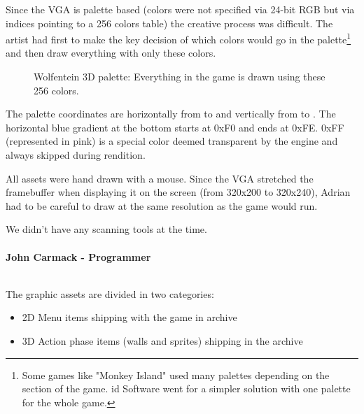 \documentclass[book.tex]{subfiles}
\begin{document}
\par
Since the VGA is palette based (colors were not specified via 24-bit RGB but via indices pointing to a 256 colors table) the creative process was difficult. The artist had first to make the key decision of which colors would go in the palette\footnote{Some games like "Monkey Island" used many palettes depending on the section of the game. id Software went for a simpler solution with one palette for the whole game.} and then draw everything with only these colors.\\
\begin{figure}[H]
  \centering
{}
 \caption{Wolfentein 3D palette: Everything in the game is drawn using these 256 colors.}
\end{figure}
The palette coordinates are horizontally from  to  and vertically from  to . The horizontal blue gradient at the bottom starts at 0xF0 and ends at 0xFE. 0xFF (represented in pink) is a special color deemed transparent by the engine and always skipped during rendition.\\
\par

All assets were hand drawn with a mouse. Since the VGA stretched the framebuffer when displaying it on the screen (from 320x200 to 320x240), Adrian had to be careful to draw at the same resolution as the game would run.\\
\par
\begin{fancyquotes}
We didn't have any scanning tools at the time.\\
\\
\textbf{John Carmack - Programmer}
\end{fancyquotes}
\\
The graphic assets are divided in two categories:
\begin{itemize}
\item 2D Menu items shipping with the game in  archive
\item 3D Action phase items (walls and sprites) shipping in the  archive
\end{itemize}
\end{document}
